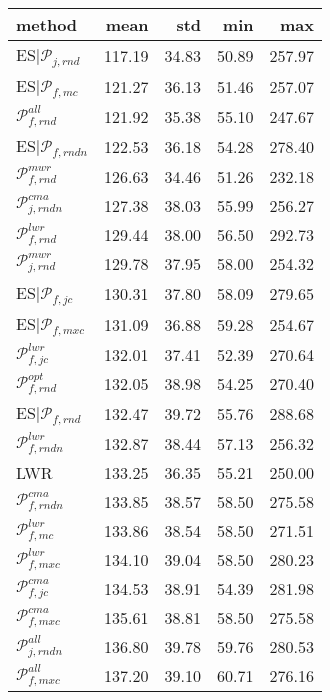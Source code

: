 \begin{tabular}{|@{}l@{}|@{}r@{}|@{}r@{}|@{}r@{}|@{}r@{}|}\hline
method & mean & std & min & max \\ \hline\hline
ES$|{\mathcal{P}_{j,rnd}}$ &  117.19 &  34.83 &  50.89 &  257.97  \\ 
ES$|{\mathcal{P}_{f,mc}}$ &  121.27 &  36.13 &  51.46 &  257.07  \\ 
\boldmath${\mathcal{P}_{f,rnd}^{all}}$ &  121.92 &  35.38 &  55.10 &  247.67  \\ 
ES$|{\mathcal{P}_{f,rndn}}$ &  122.53 &  36.18 &  54.28 &  278.40  \\ 
\boldmath${\mathcal{P}_{f,rnd}^{mwr}}$ &  126.63 &  34.46 &  51.26 &  232.18  \\ 
${\mathcal{P}_{j,rndn}^{cma}}$ &  127.38 &  38.03 &  55.99 &  256.27  \\ 
\boldmath${\mathcal{P}_{f,rnd}^{lwr}}$ &  129.44 &  38.00 &  56.50 &  292.73  \\ 
${\mathcal{P}_{j,rnd}^{mwr}}$ &  129.78 &  37.95 &  58.00 &  254.32  \\ 
ES$|{\mathcal{P}_{f,jc}}$ &  130.31 &  37.80 &  58.09 &  279.65  \\ 
ES$|{\mathcal{P}_{f,mxc}}$ &  131.09 &  36.88 &  59.28 &  254.67  \\ 
${\mathcal{P}_{f,jc}^{lwr}}$ &  132.01 &  37.41 &  52.39 &  270.64  \\ 
\boldmath${\mathcal{P}_{f,rnd}^{opt}}$ &  132.05 &  38.98 &  54.25 &  270.40  \\ 
ES\boldmath$|{\mathcal{P}_{f,rnd}}$ &  132.47 &  39.72 &  55.76 &  288.68  \\ 
${\mathcal{P}_{f,rndn}^{lwr}}$ &  132.87 &  38.44 &  57.13 &  256.32  \\ 
LWR &  133.25 &  36.35 &  55.21 &  250.00  \\ 
${\mathcal{P}_{f,rndn}^{cma}}$ &  133.85 &  38.57 &  58.50 &  275.58  \\ 
${\mathcal{P}_{f,mc}^{lwr}}$ &  133.86 &  38.54 &  58.50 &  271.51  \\ 
${\mathcal{P}_{f,mxc}^{lwr}}$ &  134.10 &  39.04 &  58.50 &  280.23  \\ 
${\mathcal{P}_{f,jc}^{cma}}$ &  134.53 &  38.91 &  54.39 &  281.98  \\ 
${\mathcal{P}_{f,mxc}^{cma}}$ &  135.61 &  38.81 &  58.50 &  275.58  \\ 
${\mathcal{P}_{j,rndn}^{all}}$ &  136.80 &  39.78 &  59.76 &  280.53  \\ 
${\mathcal{P}_{f,mxc}^{all}}$ &  137.20 &  39.10 &  60.71 &  276.16  \\ 

\end{tabular}

